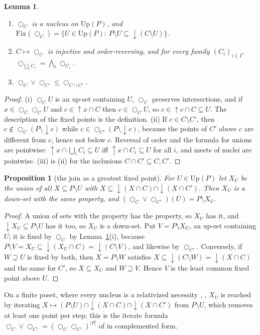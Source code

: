 \documentclass[11pt]{amsart}
\newtheorem{lem}[thm]{Lemma}
\newtheorem{prop}[thm]{Proposition}
\theoremstyle{definition}
\newcommand{\Fix}{\mathrm{Fix}}
\newcommand{\Up}{\mathrm{Up}}
\newcommand{\lax}{\bigcirc}
\newcommand{\dn}{{\downarrow}}
\newcommand{\upa}{{\uparrow}}
\begin{document}
\begin{lem}\label{lem:basic}
\begin{enumerate}
\item[(i)] $\lax_C$ is a nucleus on $\Up(P)$, and
$\Fix(\lax_C)=\{U\in\Up(P):\ P\setminus U\subseteq\dn(C\setminus U)\}$.
\item[(ii)] $C\mapsto\lax_C$ is injective and order-reversing, and for every
family $(C_i)_{i\in I}$, $\lax_{\bigcup_iC_i}=\bigwedge_i\lax_{C_i}$.
\item[(iii)] $\lax_C\vee\lax_{C'}\le\lax_{C\cap C'}$.
\end{enumerate}
\end{lem}
\begin{proof}
(i) $\lax_CU$ is an up-set containing $U$, $\lax_C$ preserves intersections,
and if $x\in\lax_C\lax_CU$ and $c\in\upa x\cap C$ then $c\in\lax_CU$, so
$c\in\upa c\cap C\subseteq U$. The description of the fixed points is the
definition. (ii) If $c\in C\setminus C'$, then $c\notin\lax_C(P\setminus\dn c)$
while $c\in\lax_{C'}(P\setminus\dn c)$, because the points of $C'$ above $c$
are different from $c$, hence not below $c$. Reversal of order and the formula
for unions are pointwise: $\upa x\cap\bigcup_iC_i\subseteq U$ iff
$\upa x\cap C_i\subseteq U$ for all $i$, and meets of nuclei are pointwise.
(iii) is (ii) for the inclusions $C\cap C'\subseteq C,C'$.
\end{proof}

\begin{prop}[the join as a greatest fixed point]\label{prop:gfp}
For $U\in\Up(P)$ let $X_U$ be the union of all $X\subseteq P\setminus U$ with
$X\subseteq\dn(X\cap C)\cap\dn(X\cap C')$. Then $X_U$ is a down-set with the
same property, and $(\lax_C\vee\lax_{C'})(U)=P\setminus X_U$.
\end{prop}
\begin{proof}
A union of sets with the property has the property, so $X_U$ has it, and
$\dn X_U\subseteq P\setminus U$ has it too, so $X_U$ is a down-set. Put
$V=P\setminus X_U$, an up-set containing $U$; it is fixed by $\lax_C$ by
Lemma~\ref{lem:basic}(i), because $P\setminus V=X_U\subseteq\dn(X_U\cap C)
=\dn(C\setminus V)$, and likewise by $\lax_{C'}$. Conversely, if $W\supseteq U$
is fixed by both, then $X=P\setminus W$ satisfies $X\subseteq\dn(C\setminus W)
=\dn(X\cap C)$ and the same for $C'$, so $X\subseteq X_U$ and $W\supseteq V$.
Hence $V$ is the least common fixed point above $U$.
\end{proof}

On a finite poset, where every nucleus is a relativized necessity
\cite[Thm.~2.12]{Lindenhovius}, \cite[Thm.~4.1]{Laxjoin}, $X_U$ is reached by iterating $X\mapsto(P\setminus U)\cap
\dn(X\cap C)\cap\dn(X\cap C')$ from $P\setminus U$, which removes at least one
point per step; this is the iterate formula
$\lax_C\vee\lax_{C'}=(\lax_C\lax_{C'})^{|P|}$ of \cite[Thm.~4.1]{Laxjoin} in
complemented form.
\end{document}

